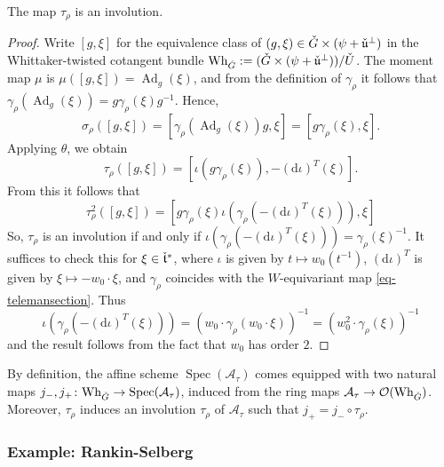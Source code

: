 \documentclass[11pt]{article}
\theoremstyle{definition}
\theoremstyle{plain}
\theoremstyle{remark}
\DeclareMathOperator{\spec}{Spec}
\DeclareMathOperator{\Ad}{Ad}
\begin{document}
        \begin{prop}\label{prop-involution}
            The map $\tau_\rho$ is an involution.
        \end{prop}
        \begin{proof}
            Write $[g,\xi]$ for the equivalence class of $(g,\xi) \in \Check{G} \times (\psi + \Check{\mathfrak{u}}^{\perp})$ in the Whittaker-twisted cotangent bundle $\mathrm{Wh}_{\Check{G}} := (\Check{G} \times (\psi + \Check{\mathfrak{u}}^{\perp}))/\Check{U}$. The moment map $\mu$ is $\mu([g,\xi]) = \Ad_{g}(\xi)$, and from the definition of $\gamma_\rho$ it follows that $\gamma_\rho(\Ad_g(\xi)) = g\gamma_\rho(\xi)g^{-1}$. Hence,
            \[
                \sigma_{\rho}([g,\xi]) = [\gamma_\rho(\Ad_g(\xi))g,\xi] = [g\gamma_\rho(\xi),\xi].
            \]
            Applying $\theta$, we obtain
            \[
               \tau_{\rho}([g,\xi]) = [\iota(g\gamma_\rho(\xi)), -(\mathrm{d}\iota)^T(\xi)].
            \]
            From this it follows that
            \[
                \tau_{\rho}^2([g,\xi]) = [g\gamma_\rho(\xi) \iota(\gamma_\rho(-(\mathrm{d}\iota)^T(\xi))), \xi]
            \]
            So, $\tau_\rho$ is an involution if and only if $\iota(\gamma_\rho(-(\mathrm{d}\iota)^T(\xi))) = \gamma_\rho(\xi)^{-1}$. It suffices to check this for $\xi \in \Check{\mathfrak{t}}^*$, where $\iota$ is given by $t \mapsto w_0(t^{-1})$, $(\mathrm{d}\iota)^T$ is given by $\xi \mapsto -w_0 \cdot \xi$, and $\gamma_\rho$ coincides with the $W$-equivariant map \eqref{eq-telemansection}. Thus
            \[
                \iota(\gamma_\rho(-(\mathrm{d}\iota)^T(\xi))) = (w_0 \cdot \gamma_\rho(w_0 \cdot \xi))^{-1} = (w_0^2 \cdot \gamma_\rho(\xi))^{-1}
            \]
            and the result follows from the fact that $w_0$ has order $2$.
        \end{proof}

        \begin{rmk}
            By definition, the affine scheme $\spec(\mathcal{A}_\tau)$ comes equipped with two natural maps $j_-,j_+\colon \mathrm{Wh}_{\Check{G}} \to \spec(\mathcal{A}_\tau)$, induced from the ring maps $\mathcal{A}_\tau \to \mathcal{O}(\mathrm{Wh}_{\Check{G}})$. Moreover, $\tau_\rho$ induces an involution $\tau_\rho$ of $\mathcal{A}_\tau$ such that $j_+ = j_- \circ \tau_\rho$.
        \end{rmk}

        
        
        \subsubsection{Example: Rankin-Selberg}
\end{document}
